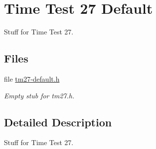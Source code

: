\hypertarget{group__shared__tm27}{}\section{Time Test 27 Default}
\label{group__shared__tm27}


Stuff for Time Test 27.  


\subsection*{Files}
\begin{DoxyCompactItemize}
\item 
file \mbox{\hyperlink{tm27-default_8h}{tm27-\/default.\+h}}
\begin{DoxyCompactList}\small\item\em Empty stub for tm27.\+h. \end{DoxyCompactList}\end{DoxyCompactItemize}


\subsection{Detailed Description}
Stuff for Time Test 27. 

